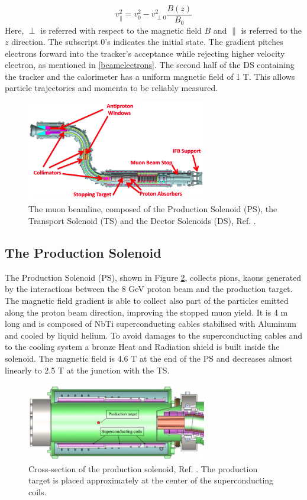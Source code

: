 \begin{equation}
    v^2_{\parallel}=v^2_0-v^2_{\perp 0}\frac{B(z)}{B_0}
\end{equation}
Here, $\perp$ is referred with respect to the magnetic field $B$ and $\parallel$ is 
referred to the $z$ direction. The subscript 0's indicates the initial state. 
The gradient pitches electrons forward into the tracker's acceptance while 
rejecting higher velocity electron, as mentioned in \ref{beamelectrons}. 
The second half of the DS containing the tracker and the calorimeter has a 
uniform magnetic field of 1 T. This allows particle trajectories and momenta 
to be reliably measured.
\begin{figure}[!h]
\centering
\includegraphics[width =0.7\textwidth]{figures/png/Screenshot_20240303_152845.png}
\caption{The muon beamline, composed of the Production Solenoid (PS), 
the Transport Solenoid (TS) and the Dector Solenoids (DS), Ref. \cite{ginther}. 
}
\label{fig:muonbeamline}
\end{figure}


\subsection{The Production Solenoid}
The Production Solenoid (PS), shown in Figure \ref{fig:PS}, collects pions, 
kaons generated by the interactions between the 8 GeV proton beam and the production target. 
The magnetic field gradient is able to collect also part of the particles 
emitted along the proton beam direction, improving the stopped muon yield.
It is 4 m long and is composed of NbTi superconducting cables stabilised with
Aluminum and cooled by liquid helium. To avoid damages to the superconducting cables and
to the cooling system a bronze Heat and Radiation shield is built inside the solenoid.
The magnetic field is 4.6 T at the end of the PS and decreases almost linearly to 2.5 T at the
junction with the TS.
\begin{figure}[!h]
    \centering
    \includegraphics[width =0.7\textwidth]{figures/png/800px-Production_solenoid.png}
    \caption{Cross-section of the production solenoid, Ref. \cite{6376120}.
    The production target is placed approximately at the center of the superconducting coils.}
    \label{fig:PS}
    \end{figure}
